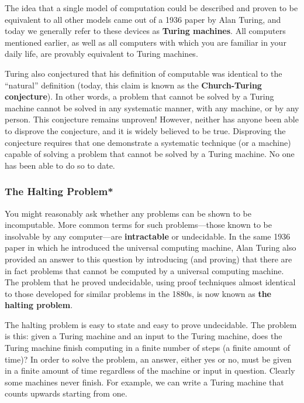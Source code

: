 The idea that a single model of computation could be described and proven
to be equivalent to all other models came out of a 1936 paper by Alan Turing, 
and today we generally refer to these devices as {\bf Turing machines}.
%
All computers mentioned earlier, as well as all computers with which you 
are familiar in your daily life, are provably equivalent to Turing machines.

Turing also conjectured that his definition of computable was
identical to the ``natural'' definition (today, this claim is known
as the {\bf Church-Turing conjecture}).  In other words, a problem that
cannot be solved by a Turing machine cannot be solved in any
systematic manner, with any machine, or by any person.  This conjecture
remains unproven!  However, neither has anyone been able to disprove
the conjecture, and it is widely believed to be true.  Disproving the
conjecture requires that one demonstrate a systematic technique (or a
machine) capable of solving a problem that cannot be solved by a
Turing machine.  No one has been able to do so to date.\\


\subsubsection{The Halting Problem*}

You might reasonably ask whether any problems can be shown to
be incomputable.  More common terms for such problems---those known
to be insolvable by any computer---are {\bf intractable} or 
undecidable.
%
In the same 1936 paper in which he introduced the universal computing
machine, Alan Turing also provided an answer to this question
by introducing (and proving) that there are in fact problems that cannot be
computed by a universal computing machine.
The problem that
he proved undecidable, using proof techniques almost identical to those
developed for similar problems in the 1880s, is now known as {\bf the
halting problem}.

\pagebreak

The halting problem is easy to state and easy to prove undecidable.
The problem is this: given a Turing machine and an input to the Turing
machine, does the Turing machine finish computing in a finite number
of steps (a finite amount of time)?  In order to solve the problem, an
answer, either yes or no, must be given in a finite amount of time
regardless of the machine or input in question.  Clearly some machines
never finish.  For example, we can write a Turing machine that counts
upwards starting from one.


